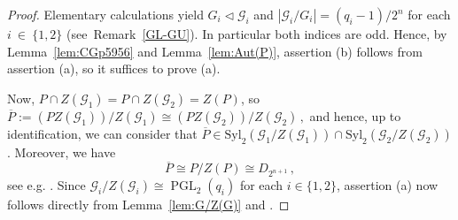 \documentclass[12pt,a4paper]{amsart}
\theoremstyle{plain}\newtheorem{Theorem}{Theorem}[section]
\theoremstyle{plain}\newtheorem{Conjecture}[Theorem]{Conjecture}
\theoremstyle{plain}\newtheorem{Corollary}[Theorem]{Corollary}
\theoremstyle{plain}\newtheorem{Lemma}[Theorem]{Lemma}
\theoremstyle{plain}\newtheorem{Proposition}[Theorem]{Proposition}
\theoremstyle{definition}\newtheorem{Definition}[Theorem]{Definition}
\theoremstyle{definition}\newtheorem{Example}[Theorem]{Example}
\theoremstyle{definition}\newtheorem{Examples}[Theorem]{Examples}
\theoremstyle{definition}\newtheorem{Remark}[Theorem]{Remark}
\theoremstyle{definition}\newtheorem{Question}[Theorem]{Question}
\theoremstyle{definition}\newtheorem{Notation}[Theorem]{Notation}
\theoremstyle{definition}\newtheorem{Hypothesis}[Theorem]{Hypothesis}
\theoremstyle{definition}\newtheorem{Assumption}[Theorem]{Assumption}
\theoremstyle{definition}\newtheorem{Strategy}[Theorem]{Strategy}
\theoremstyle{definition}\newtheorem{Contents}[Theorem]{Contents}
\theoremstyle{definition}\newtheorem{Computations}[Theorem]{Computations}
\theoremstyle{definition}\newtheorem{Equivalences}[Theorem]{Equivalences}
\theoremstyle{definition}\newtheorem{Notation/Definition}[Theorem]{Notation/Definition}
\theoremstyle{definition}\newtheorem{noth}[Theorem]{}
\theoremstyle{plain}\newtheorem{Step}[Theorem]{Step}
\def\Syl{\mathrm{Syl}}
\newcommand{\PGL}{\operatorname{PGL}}
\begin{document}
\begin{proof}
Elementary calculations yield $G_{i}\lhd\mathcal{G}_{i}$ and $|\mathcal G_i/G_i|=({q_i}-1)/2^n$ 
for each $i~\in~\{1,2\}$  (see~Remark~\ref{GL-GU}). In particular 
both indices are odd. Hence, by Lemma~\ref{lem:CGp5956} and Lemma~\ref{lem:Aut(P)}, 
assertion (b) follows from assertion (a), so it suffices to prove (a). \par
Now, $P\cap Z(\mathcal G_1)=P\cap Z(\mathcal G_2)=Z(P)$, so 
$\overline P:=(PZ(\mathcal G_1))/Z(\mathcal G_1)\cong (PZ(\mathcal G_2))/Z(\mathcal G_2)\,,$
and hence, up to identification, we can consider that 
$\overline P\in\Syl_2(\mathcal G_1/Z(\mathcal G_1))\cap\Syl_2(\mathcal G_2/Z(\mathcal G_2))$.
Moreover, we have 
$$\overline P\cong P/Z(P)\cong D_{2^{n+1}}\,,$$
see e.g. \cite[(2.A)~Lemma~(iii)]{Kue80}.
Since $\mathcal G_i/Z(\mathcal G_i)\cong \PGL_2(q_i)$ for each $i\in\{1,2\}$, assertion (a) now follows
directly  from Lemma~\ref{lem:G/Z(G)} and \cite[Theorem 1.1]{KL20a}.
\end{proof}
\end{document}

